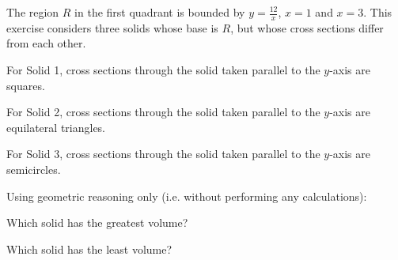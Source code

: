\documentclass{ximera}
\author{Jim Talamo}
\begin{document}
\begin{exercise}


The region $R$ in the first quadrant is bounded by $y=\frac{12}{x}$, $x=1$ and $x=3$.  This exercise considers three solids whose base is $R$, but whose cross sections differ from each other. 


\begin{image}
\end{image}


For Solid 1, cross sections through the solid taken parallel to the $y$-axis are squares.

For Solid 2, cross sections through the solid taken parallel to the $y$-axis are equilateral triangles.

For Solid 3, cross sections through the solid taken parallel to the $y$-axis are semicircles.

\begin{exercise}
Using geometric reasoning only (i.e. without performing any calculations):

Which solid has the greatest volume?
\begin{multipleChoice}
\end{multipleChoice}

Which solid has the least volume?
\begin{multipleChoice}
\end{multipleChoice}


\end{exercise}
\end{exercise}
\end{document}
